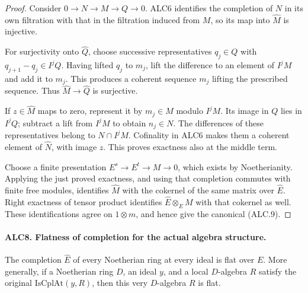 \documentclass[11pt,a4paper]{article}
\numberwithin{equation}{section}
\theoremstyle{remark}\newtheorem{remark}[theorem]{Remark}
\begin{document}
\begin{proof}
Consider \(0\to N\to M\to Q\to0\).  ALC6 identifies
the completion of \(N\) in its own filtration with that in
the filtration induced from \(M\), so its map into
\(\widehat M\) is injective.

For surjectivity onto \(\widehat Q\), choose successive
representatives \(q_j\in Q\) with
\(q_{j+1}-q_j\in I^jQ\).  Having lifted \(q_j\) to
\(m_j\), lift the difference to an element of \(I^jM\)
and add it to \(m_j\).  This produces a coherent sequence
\(m_j\) lifting the prescribed sequence.  Thus
\(\widehat M\to\widehat Q\) is surjective.

If \(z\in\widehat M\) maps to zero, represent it by
\(m_j\in M\) modulo \(I^jM\).  Its image in \(Q\)
lies in \(I^jQ\); subtract a lift from \(I^jM\) to obtain
\(n_j\in N\).  The differences of these representatives
belong to \(N\cap I^jM\).  Cofinality in ALC6 makes them
a coherent element of \(\widehat N\), with image \(z\).
This proves exactness also at the middle term.

Choose a finite presentation \(E^s\to E^t\to M\to0\),
which exists by Noetherianity.  Applying the just proved
exactness, and using that completion commutes with finite
free modules, identifies \(\widehat M\) with the cokernel
of the same matrix over \(\widehat E\).  Right exactness
of tensor product identifies \(\widehat E\otimes_E M\)
with that cokernel as well.  These identifications agree on
\(1\otimes m\), and hence give the canonical (ALC.9).
\end{proof}

\paragraph{ALC8. Flatness of completion for the actual algebra structure.}
\label{claim:ALC8}
The completion \(\widehat E\) of every Noetherian ring at
every ideal is flat over \(E\).  More generally, if a
Noetherian ring \(D\), an ideal \(y\), and a local
\(D\)-algebra \(R\) satisfy the original
\(\mathrm{IsCplAt}(y,R)\), then this very \(D\)-algebra
\(R\) is flat.
\end{document}
